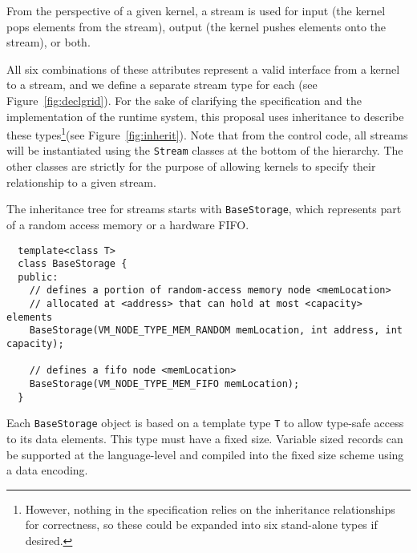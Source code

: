 From the perspective of a given kernel, a stream is used for input (the kernel pops elements from the stream), output (the kernel pushes elements onto the stream), or both.

All six combinations of these attributes represent a valid interface
from a kernel to a stream, and we define a separate stream type for
each (see Figure~\ref{fig:declgrid}).  For the sake of clarifying the
specification and the implementation of the runtime system, this
proposal uses inheritance to describe these types\footnote{However,
nothing in the specification relies on the inheritance relationships
for correctness, so these could be expanded into six stand-alone types
if desired.}(see Figure~\ref{fig:inherit}).  Note that from the
control code, all streams will be instantiated using the {\tt Stream}
classes at the bottom of the hierarchy.  The other classes are strictly
for the purpose of allowing kernels to specify their relationship to a
given stream.



The inheritance tree for streams starts with {\tt BaseStorage}, which
represents part of a random access memory or a hardware FIFO.  {\small
\begin{verbatim}
  template<class T>
  class BaseStorage {
  public:
    // defines a portion of random-access memory node <memLocation>
    // allocated at <address> that can hold at most <capacity> elements
    BaseStorage(VM_NODE_TYPE_MEM_RANDOM memLocation, int address, int capacity);

    // defines a fifo node <memLocation>
    BaseStorage(VM_NODE_TYPE_MEM_FIFO memLocation);
  }
\end{verbatim}}

Each {\tt BaseStorage} object is based on a template type {\tt T} to
allow type-safe access to its data elements.  This type must have a
fixed size.  Variable sized records can be supported at the
language-level and compiled into the fixed size scheme using a data
encoding.


\clearpage


